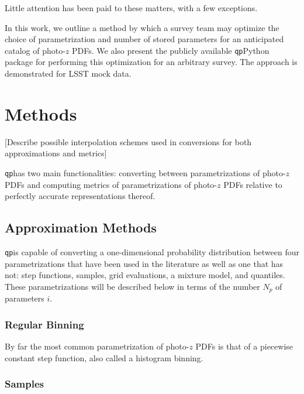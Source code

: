 \documentclass[\docopts]{\docclass}
\newcommand{\qp}{\texttt{qp}}
\begin{document}
Little attention has been paid to these matters, with a few exceptions.  
\citep{carrasco_kind_sparse_2014}

In this work, we outline a method by which a survey team may optimize the 
choice of parametrization and number of stored parameters for an anticipated 
catalog of photo-$z$ PDFs.  We also present the publicly available \qp Python 
package for performing this optimization for an arbitrary survey.  The approach 
is demonstrated for LSST mock data.








\section{Methods}
\label{sec:methods}

[Describe possible interpolation schemes used in conversions for both 
approximations and metrics]


\qp has two main functionalities: converting between parametrizations of 
photo-$z$ PDFs and computing metrics of parametrizations of photo-$z$ PDFs 
relative to perfectly accurate representations thereof.

\subsection{Approximation Methods}
\label{sec:approx}


\qp is capable of converting a one-dimensional probability distribution between 
four parametrizations that have been used in the literature as well as one that 
has not: step functions, samples, grid evaluations, a mixture model, and 
quantiles.  These parametrizations will be described below in terms of the 
number $N_{p}$ of parameters $i$.


\subsubsection{Regular Binning}
\label{sec:bins}

By far the most common parametrization of photo-$z$ PDFs is that of a piecewise 
constant step function, also called a histogram binning.  
\citep{tanaka_photometric_2017, sheldon_photometric_2012}

\subsubsection{Samples}
\label{sec:samples}
\end{document}
